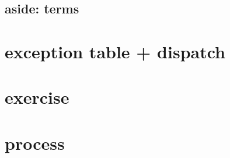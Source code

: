 \subsection{aside: terms}


\section{exception table + dispatch}



\section{exercise}


\section{process}




